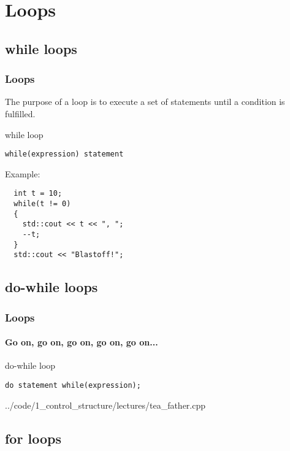 \documentclass{beamer}
\begin{document}
\section{Loops}

\subsection{while loops}

\begin{frame}[fragile]
  \frametitle{Loops}
  The purpose of a loop is to execute a set of statements until a condition is fulfilled.
  \pause
  \begin{block}{while loop}
    \begin{lstlisting}
while(expression) statement
    \end{lstlisting}
    Example:
  \begin{lstlisting}
  int t = 10;
  while(t != 0)
  {
    std::cout << t << ", ";
    --t;  
  }
  std::cout << "Blastoff!";
  \end{lstlisting}
  \end{block}
\end{frame}

\subsection{do-while loops}

\begin{frame}[fragile]
  \frametitle{Loops}
  \framesubtitle{Go on, go on, go on, go on, go on...}
  
  \begin{block}{do-while loop}
    \begin{lstlisting}
do statement while(expression);
    \end{lstlisting}
    {../code/1_control_structure/lectures/tea_father.cpp}
  \end{block}
\end{frame}

\subsection{for loops}
\end{document}
